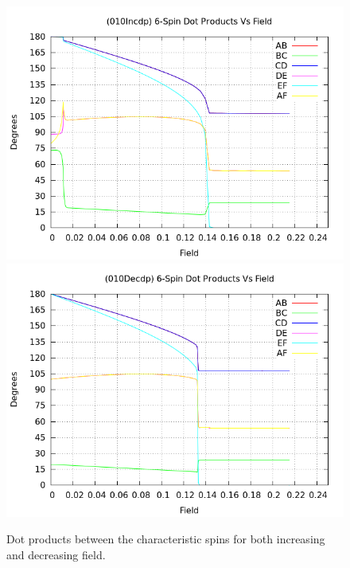 \documentclass{article}
\begin{document}
\begin{figure}[ht]
\centering
\includegraphics[scale=0.5]{HVariedData/Pictures/010Incdp.png}
\includegraphics[scale=0.5]{HVariedData/Pictures/010Decdp.png}
\caption{Dot products between the characteristic spins for both increasing and decreasing field.}
\end{figure}
\clearpage
\end{document}
